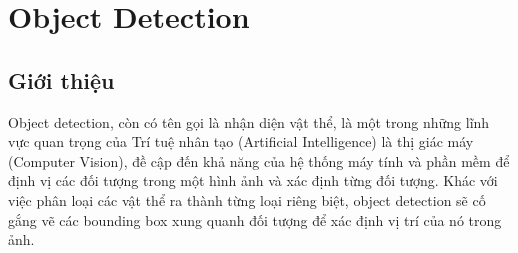 \chapter{Object Detection}
\section{Giới thiệu}
Object detection, còn có tên gọi là nhận diện vật thể, là một trong những lĩnh vực quan trọng của Trí tuệ nhân tạo (Artificial Intelligence) là thị giác máy (Computer Vision), đề cập đến khả năng của hệ thống máy tính và phần mềm để định vị các đối tượng trong một hình ảnh và xác định từng đối tượng. Khác với việc phân loại các vật thể ra thành từng loại riêng biệt, object detection sẽ cố gắng vẽ các bounding box xung quanh đối tượng để xác định vị trí của nó trong ảnh. \par

